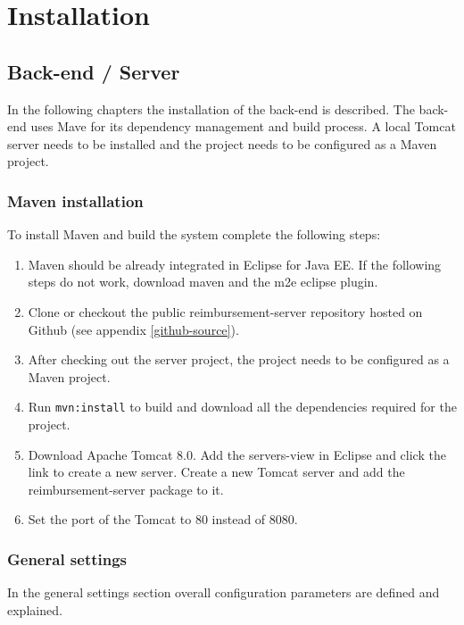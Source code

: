 \appendix

\chapter{Installation}
\label{chap:installation}

\section{Back-end / Server}
\label{sec:backend-server}

In the following chapters the installation of the back-end is described. The back-end uses Mave for its dependency management and build process. A local Tomcat server needs to be installed and the project needs to be configured as a Maven project.

\subsection{Maven installation}
To install Maven and build the system complete the following steps:

\begin{enumerate}
    \item Maven should be already integrated in Eclipse for Java EE. If the following steps do not work, download maven and the m2e eclipse plugin.
    \item Clone or checkout the public reimbursement-server repository hosted on Github (see appendix \ref{github-source}).
    \item After checking out the server project, the project needs to be configured as a Maven project.
    \item Run \texttt{mvn:install} to build and download all the dependencies required for the project. 
    \item Download Apache Tomcat 8.0. Add the servers-view in Eclipse and click the link to create a new server. Create a new Tomcat server and add the reimbursement-server package to it.
    \item Set the port of the Tomcat to 80 instead of 8080.
\end{enumerate}

\subsection{General settings}

In the general settings section overall configuration parameters are defined and explained.


